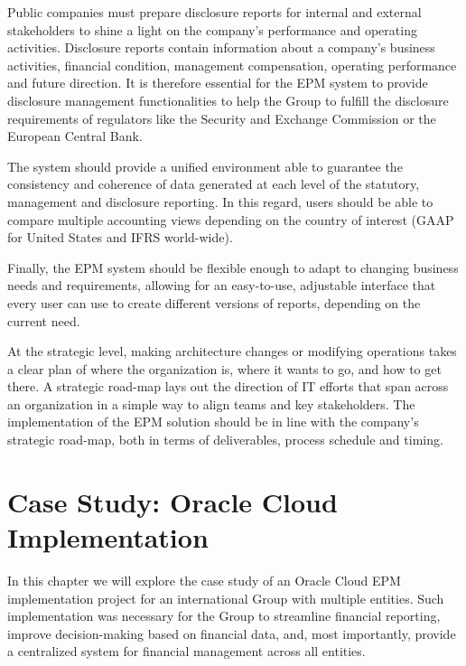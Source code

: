 \documentclass[12pt,a4paper,openright,twoside]{book}
\begin{document}
Public companies must prepare disclosure reports for internal and external stakeholders to shine a light on the company's performance and operating activities.
%
Disclosure reports contain information about a company's business activities, financial condition, management compensation, operating performance and future direction. 
%
It is therefore essential for the EPM system to provide disclosure management functionalities to help the Group to fulfill the disclosure requirements of regulators like the Security and Exchange Commission or the European Central Bank.

The system should provide  a unified environment able to guarantee the consistency and coherence of data generated at each level of the statutory, management and disclosure reporting.
%
In this regard, users should be able to compare multiple accounting views depending on the country of interest (GAAP for United States and IFRS world-wide).

Finally, the EPM system should be flexible enough to adapt to changing business needs and requirements, allowing for an easy-to-use, adjustable interface that every user can use to create different versions of reports, depending on the current need.

At the strategic level, making architecture changes or modifying operations takes a clear plan of where the organization is, where it wants to go, and how to get there. 
%
A strategic road-map lays out the direction of IT efforts that span across an organization in a simple way to align teams and key stakeholders.
%
The implementation of the EPM solution should be in line with the company's strategic road-map, both in terms of deliverables, process schedule and timing.

\chapter{Case Study: Oracle Cloud Implementation}
\label{chap:implementation}

In this chapter we will explore the case study of an Oracle Cloud EPM implementation project for an international Group with multiple entities.
%
Such implementation was necessary for the Group to streamline financial reporting, improve decision-making based on financial data, and, most importantly, provide a centralized system for financial management across all entities.
\end{document}
